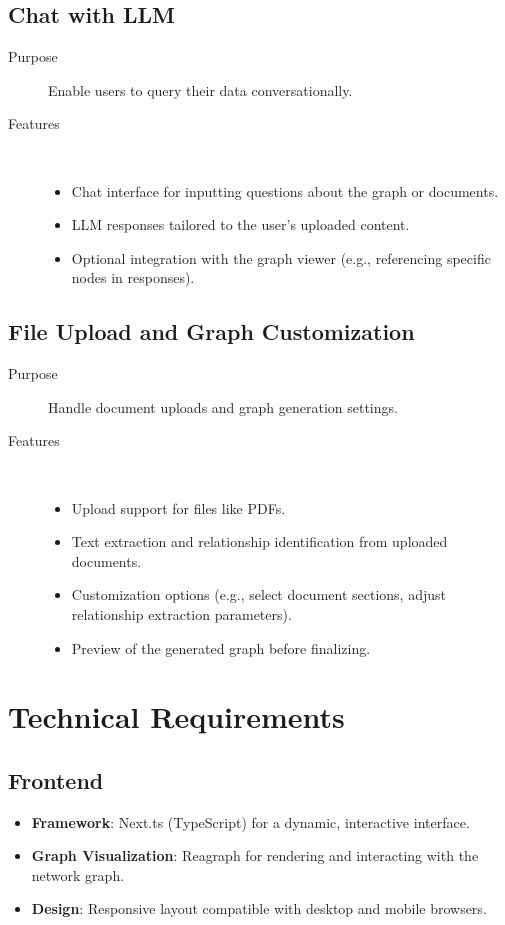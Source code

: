 \documentclass[%
 reprint,
 amsmath,amssymb,
 aps,
]{revtex4-2}
\begin{document}
\subsection{\label{sec:chat_llm}Chat with LLM}
\begin{description}
\item[Purpose] Enable users to query their data conversationally.
\item[Features] ~
\begin{itemize}
\item Chat interface for inputting questions about the graph or documents.
\item LLM responses tailored to the user's uploaded content.
\item Optional integration with the graph viewer (e.g., referencing specific nodes in responses).
\end{itemize}
\end{description}

\subsection{\label{sec:file_upload}File Upload and Graph Customization}
\begin{description}
\item[Purpose] Handle document uploads and graph generation settings.
\item[Features] ~
\begin{itemize}
\item Upload support for files like PDFs.
\item Text extraction and relationship identification from uploaded documents.
\item Customization options (e.g., select document sections, adjust relationship extraction parameters).
\item Preview of the generated graph before finalizing.
\end{itemize}
\end{description}

\section{\label{sec:technical_requirements}Technical Requirements}

\subsection{\label{sec:frontend}Frontend}
\begin{itemize}
\item \textbf{Framework}: Next.ts (TypeScript) for a dynamic, interactive interface.
\item \textbf{Graph Visualization}: Reagraph for rendering and interacting with the network graph.
\item \textbf{Design}: Responsive layout compatible with desktop and mobile browsers.
\end{itemize}
\end{document}
